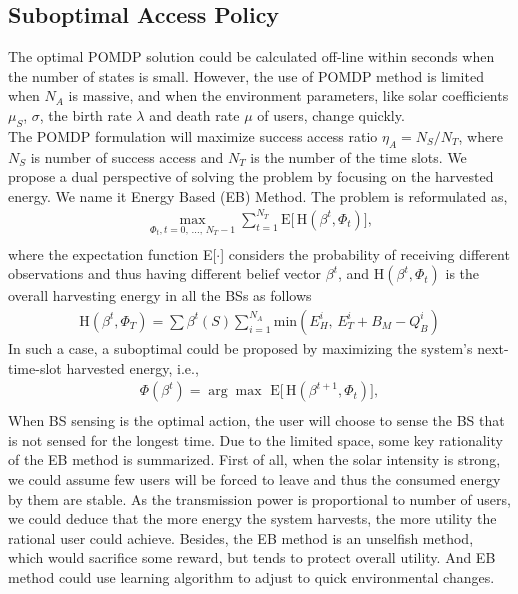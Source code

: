 \documentclass[journal,12pt,draftclsnofoot,onecolumn]{IEEEtran}
\begin{document}
\subsection{Suboptimal Access Policy}
The optimal POMDP solution could be calculated off-line within seconds when the number of states is small.
However, the use of POMDP method is limited when \(N_A\) is massive,
and when the environment parameters, like solar coefficients \(\mu_S\), \(\sigma\),
the birth rate \(\lambda\) and death rate \(\mu\) of users, change quickly.\\
The POMDP formulation will maximize success access ratio \(\eta_A = N_S/N_T\),
where \(N_S\) is number of success access and \(N_T\) is the number of the time slots.
We propose a dual perspective of solving the problem by focusing on the harvested energy.
We name it Energy Based (EB) Method.
The problem is reformulated as,
\begin{equation}
\begin{aligned}
	\underset{\Phi_t,t=0,\,\ldots,\,N_T-1}{\max}\sum\nolimits_{t=1}^{N_T}
	\mbox{E}\big[\,\mbox{H}\left(\beta^t, \Phi_t\right)\big],\\
\end{aligned}
\end{equation}
where the expectation function E[\(\cdot\)] considers the probability of receiving different observations
and thus having different belief vector \(\beta^t\), and $\mbox{H}\left(\beta^t, \Phi_t\right)$ is the overall harvesting energy in all the BSs as follows
\begin{equation}
\begin{aligned}
	\mbox{H}\left(\beta^t, \Phi_T\right) = \sum\beta^t\left(S\right)\sum_{i=1}^{N_A}
	\mbox{min}\left(E_H^i,\,E_T^i+B_M-Q_B^i\right)
\end{aligned}
\end{equation}
In such a case, a suboptimal could be proposed by maximizing the system's next-time-slot harvested energy, i.e.,
\begin{equation}
\begin{aligned}
	\Phi\left(\beta^t\right) = \arg{\max}\,\,\mbox{E}\big\lbrack\,\mbox{H}(\beta^{t+1}, \Phi_t)\big\rbrack,\\
\end{aligned}
\end{equation}
When BS sensing is the optimal action, the user will choose to sense the BS that is not sensed for the longest time.
Due to the limited space, some key rationality of the EB method is summarized.
First of all, when the solar intensity is strong,
we could assume few users will be forced to leave and thus the consumed energy by them are stable.
As the transmission power is proportional to number of users,
we could deduce that the more energy the system harvests,
the more utility the rational user could achieve.
Besides, the EB method is an unselfish method, which would sacrifice some reward,
but tends to protect overall utility.
And EB method could use learning algorithm to adjust to quick environmental changes.
\end{document}
